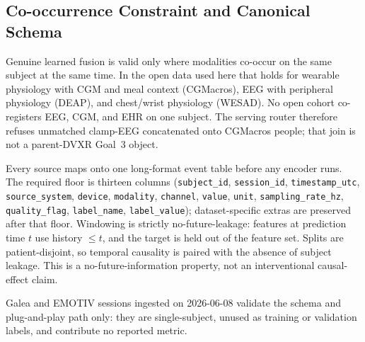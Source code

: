 \subsection{Co-occurrence Constraint and Canonical Schema}
\label{subsec:ingestion}

Genuine learned fusion is valid only where modalities co-occur on the same subject at the same
time. In the open data used here that holds for wearable physiology with CGM and meal context
(CGMacros), EEG with peripheral physiology (DEAP), and chest/wrist physiology (WESAD). No open
cohort co-registers EEG, CGM, and EHR on one subject. The serving router therefore refuses
unmatched clamp-EEG concatenated onto CGMacros people; that join is not a parent-DVXR Goal~3
object.

Every source maps onto one long-format event table before any encoder runs. The required floor is
thirteen columns (\texttt{subject\_id}, \texttt{session\_id}, \texttt{timestamp\_utc},
\texttt{source\_system}, \texttt{device}, \texttt{modality}, \texttt{channel}, \texttt{value},
\texttt{unit}, \texttt{sampling\_rate\_hz}, \texttt{quality\_flag}, \texttt{label\_name},
\texttt{label\_value}); dataset-specific extras are preserved after that floor. Windowing is
strictly no-future-leakage: features at prediction time $t$ use history $\le t$, and the target
is held out of the feature set. Splits are patient-disjoint, so temporal causality is paired with
the absence of subject leakage. This is a no-future-information property, not an interventional
causal-effect claim.

Galea and EMOTIV sessions ingested on 2026-06-08 validate the schema and plug-and-play path only:
they are single-subject, unused as training or validation labels, and contribute no reported
metric.
